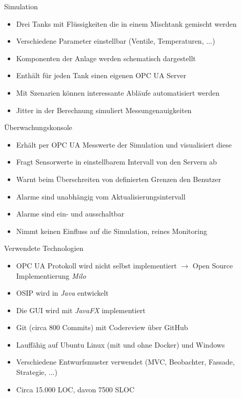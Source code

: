 \documentclass[22pt]{beamer}
\begin{document}
\begin{frame}{Simulation}
 \begin{itemize}[<+->]
  \item Drei Tanks mit Flüssigkeiten die in einem Mischtank gemischt werden
  \item Verschiedene Parameter einstellbar (Ventile, Temperaturen, ...)
  \item Komponenten der Anlage werden schematisch dargestellt
  \item Enthält für jeden Tank einen eigenen OPC UA Server
  \item Mit Szenarien können interessante Abläufe automatisiert werden
  \item Jitter in der Berechnung simuliert Messungenauigkeiten
 \end{itemize}
\end{frame}

\begin{frame}{Überwachungskonsole}
 \begin{itemize}[<+->]
  \item Erhält per OPC UA Messwerte der Simulation und visualisiert diese
  \item Fragt Sensorwerte in einstellbarem Intervall von den Servern ab
  \item Warnt beim Überschreiten von definierten Grenzen den Benutzer
  \item Alarme sind unabhängig vom Aktualisierungsintervall
  \item Alarme sind ein- und ausschaltbar
  \item Nimmt keinen Einfluss auf die Simulation, reines Monitoring
 \end{itemize}
\end{frame}

\begin{frame}{Verwendete Technologien}
\begin{itemize}[<+->]
 \item OPC UA Protokoll wird nicht selbst implementiert $\rightarrow$ Open Source Implementierung \emph{Milo}
 \item OSIP wird in \emph{Java} entwickelt
 \item Die GUI wird mit \emph{JavaFX} implementiert
 \item Git (circa 800 Commits) mit Codereview über GitHub
 \item Lauffähig auf Ubuntu Linux (mit und ohne Docker) und Windows
 \item Verschiedene Entwurfsmuster verwendet (MVC, Beobachter, Fassade, Strategie, ...)
 \item Circa 15.000 LOC, davon 7500 SLOC
\end{itemize}
\end{frame}
\end{document}
